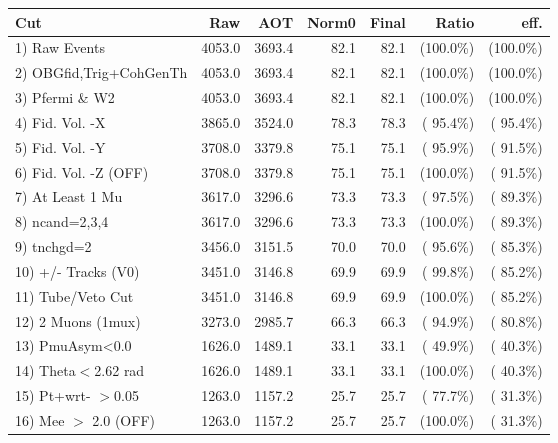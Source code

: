 \begin{table}[h!]\centering
 \begin{tabular}{||l||r|r|r|r|r|r||}
 \hline
 \hline
 Cut & Raw & AOT & Norm0 & Final & Ratio & eff.       \\
 \hline
  1) Raw Events           &       4053.0 &       3693.4 &         82.1 &         82.1 & (100.0\%) & (100.0\%) \\
  2) OBGfid,Trig+CohGenTh &       4053.0 &       3693.4 &         82.1 &         82.1 & (100.0\%) & (100.0\%) \\
  3) Pfermi \& W2         &       4053.0 &       3693.4 &         82.1 &         82.1 & (100.0\%) & (100.0\%) \\
  4) Fid. Vol. -X         &       3865.0 &       3524.0 &         78.3 &         78.3 & ( 95.4\%) & ( 95.4\%) \\
  5) Fid. Vol. -Y         &       3708.0 &       3379.8 &         75.1 &         75.1 & ( 95.9\%) & ( 91.5\%) \\
  6) Fid. Vol. -Z (OFF)   &       3708.0 &       3379.8 &         75.1 &         75.1 & (100.0\%) & ( 91.5\%) \\
  7) At Least 1 Mu        &       3617.0 &       3296.6 &         73.3 &         73.3 & ( 97.5\%) & ( 89.3\%) \\
  8) ncand=2,3,4          &       3617.0 &       3296.6 &         73.3 &         73.3 & (100.0\%) & ( 89.3\%) \\
  9) tnchgd=2             &       3456.0 &       3151.5 &         70.0 &         70.0 & ( 95.6\%) & ( 85.3\%) \\
 10) +/- Tracks (V0)      &       3451.0 &       3146.8 &         69.9 &         69.9 & ( 99.8\%) & ( 85.2\%) \\
 11) Tube/Veto Cut        &       3451.0 &       3146.8 &         69.9 &         69.9 & (100.0\%) & ( 85.2\%) \\
 12) 2 Muons (1mux)       &       3273.0 &       2985.7 &         66.3 &         66.3 & ( 94.9\%) & ( 80.8\%) \\
 13) PmuAsym<0.0          &       1626.0 &       1489.1 &         33.1 &         33.1 & ( 49.9\%) & ( 40.3\%) \\
 14) Theta$<$2.62 rad     &       1626.0 &       1489.1 &         33.1 &         33.1 & (100.0\%) & ( 40.3\%) \\
 15) Pt+wrt- $>$0.05      &       1263.0 &       1157.2 &         25.7 &         25.7 & ( 77.7\%) & ( 31.3\%) \\
 16) Mee $>$ 2.0  (OFF)   &       1263.0 &       1157.2 &         25.7 &         25.7 & (100.0\%) & ( 31.3\%) \\

\end{tabular}
\end{table}
